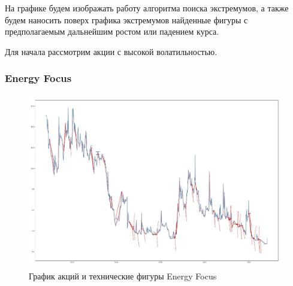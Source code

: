 \documentclass[bachelor, och, coursework]{SCWorks}
\begin{document}
    На графике будем изображать работу алгоритма поиска экстремумов, а также
    будем наносить поверх графика экстремумов найденные фигуры с предполагаемым 
    дальнейшим ростом или падением курса.
    
    Для начала рассмотрим акции с высокой волатильностью.
    
    \subsubsection{Energy Focus}
    
    \begin{figure}[H]
        \centering
        \includegraphics[width=\textwidth]{pic/EFOI.jpg}
        \caption{График акций и технические фигуры Energy Focus}
    \end{figure}
   
\end{document}

